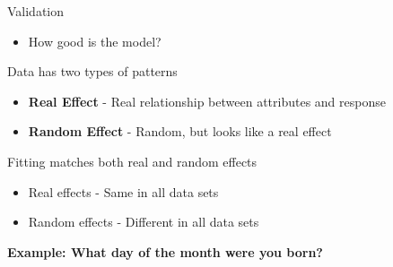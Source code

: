\documentclass[
]{book}
\providecommand{\tightlist}{%
  \setlength{\itemsep}{0pt}\setlength{\parskip}{0pt}}
\begin{document}
Validation

\begin{itemize}
\tightlist
\item
  How good is the model?
\end{itemize}

Data has two types of patterns

\begin{itemize}
\tightlist
\item
  \textbf{Real Effect} - Real relationship between attributes and response
\item
  \textbf{Random Effect} - Random, but looks like a real effect
\end{itemize}

Fitting matches both real and random effects

\begin{itemize}
\tightlist
\item
  Real effects - Same in all data sets
\item
  Random effects - Different in all data sets
\end{itemize}

\textbf{Example: What day of the month were you born?}
\end{document}
